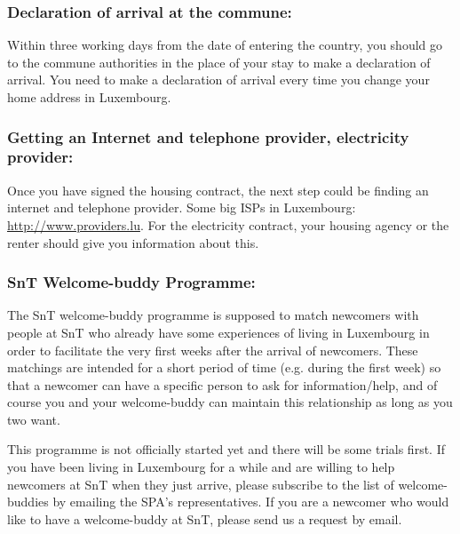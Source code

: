 \subsubsection{Declaration of arrival at the commune: } Within three working days from the date of entering the country, you should go to the commune authorities in the place of your stay to make a declaration of arrival. 
You need to make a declaration of arrival every time you change your home address in Luxembourg. 

\subsubsection{Getting an Internet and telephone provider, electricity provider:} Once you have signed the housing contract, the next step could be finding an internet and telephone provider. 
Some big ISPs in Luxembourg: \url{http://www.providers.lu}. 
For the electricity contract, your housing agency or the renter should give you information about this. 

\subsubsection{SnT Welcome-buddy Programme:} The SnT welcome-buddy programme is supposed to match newcomers with people at SnT who already have some experiences of living in Luxembourg in order to facilitate the very first weeks after the arrival of newcomers. 
These matchings are intended for a short period of time (e.g. during the first week) so that a newcomer can have a specific person to ask for information/help, and of course you and your welcome-buddy can maintain this relationship as long as you two want. 

This programme is not officially started yet and there will be some trials first. 
If you have been living in Luxembourg for a while and are willing to help newcomers at SnT when they just arrive, please subscribe to the list of welcome-buddies by emailing the SPA's representatives. 
If you are a newcomer who would like to have a welcome-buddy at SnT, please send us a request by email. 


